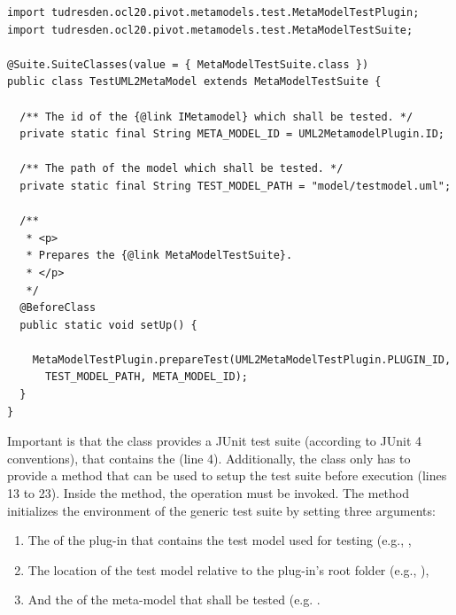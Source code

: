 \lstset{
  language=Java
}
\begin{lstlisting}[caption={An instantiation of the generic meta-model test suite.}, captionpos=b, label=list:metaModelTestSuite:constraints01, float]
import tudresden.ocl20.pivot.metamodels.test.MetaModelTestPlugin;
import tudresden.ocl20.pivot.metamodels.test.MetaModelTestSuite;

@Suite.SuiteClasses(value = { MetaModelTestSuite.class })
public class TestUML2MetaModel extends MetaModelTestSuite {

  /** The id of the {@link IMetamodel} which shall be tested. */
  private static final String META_MODEL_ID = UML2MetamodelPlugin.ID;

  /** The path of the model which shall be tested. */
  private static final String TEST_MODEL_PATH = "model/testmodel.uml";

  /**
   * <p>
   * Prepares the {@link MetaModelTestSuite}.
   * </p>
   */
  @BeforeClass
  public static void setUp() {

    MetaModelTestPlugin.prepareTest(UML2MetaModelTestPlugin.PLUGIN_ID, 
      TEST_MODEL_PATH, META_MODEL_ID);
  }
}
\end{lstlisting}

Important is that the class provides a JUnit test suite (according to JUnit 4 conventions), that contains the  (line 4). Additionally, the class only has to provide a  method that can be used to setup the test suite before execution (lines 13 to 23). Inside the  method, the operation  must be invoked. The method initializes the environment of the generic test suite by setting three arguments:

\begin{enumerate}
	\item The  of the plug-in that contains the test model used for testing (e.g., ,
	\item The location of the test model relative to the plug-in's root folder (e.g., ),
	\item And the  of the meta-model that shall be tested (e.g. .
\end{enumerate}

